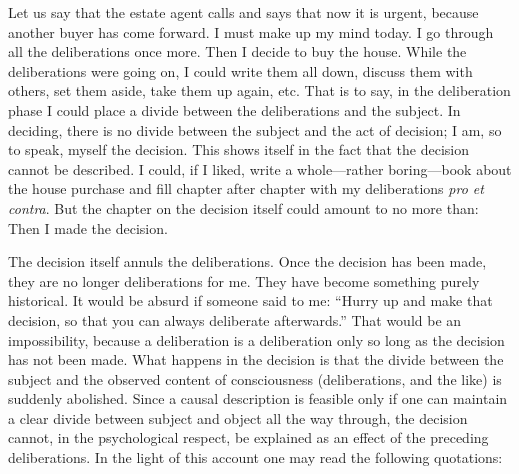 \documentclass[12pt,a4paper]{book}
\begin{document}
Let us say that the estate agent calls and says that now it is urgent, because another buyer has come forward. I must make up my mind today. I go through all the deliberations once more. Then I decide to buy the house. While the deliberations were going on, I could write them all down, discuss them with others, set them aside, take them up again, etc. That is to say, in the deliberation phase I could place a divide between the deliberations and the subject. In deciding, there is no divide between the subject and the act of decision; I am, so to speak, myself the decision. This shows itself in the fact that the decision cannot be described. I could, if I liked, write a whole---rather boring---book about the house purchase and fill chapter after chapter with my deliberations \textit{pro et contra}. But the chapter on the decision itself could amount to no more than: Then I made the decision.

The decision itself annuls the deliberations. Once the decision has been made, they are no longer deliberations for me. They have become something purely historical. It would be absurd if someone said to me: ``Hurry up and make that decision, so that you can always deliberate afterwards.'' That would be an impossibility, because a deliberation is a deliberation only so long as the decision has not been made. What happens in the decision is that the divide between the subject and the observed content of consciousness (deliberations, and the like) is suddenly abolished. Since a causal description is feasible only if one can maintain a clear divide between subject and object all the way through, the decision cannot, in the psychological respect, be explained as an effect of the preceding deliberations. In the light of this account one may read the following quotations:
\end{document}
